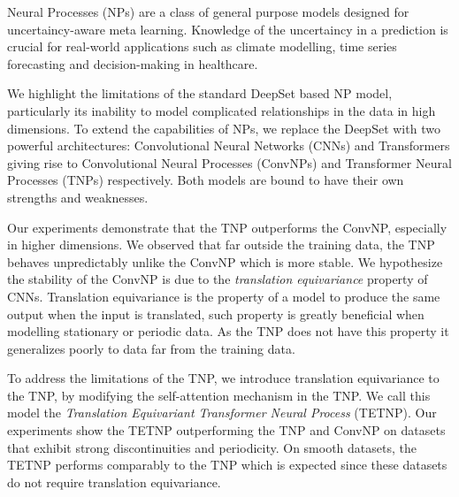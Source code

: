 \documentclass[../../main.tex]{subfiles}
\begin{document}

Neural Processes (NPs) are a class of general purpose models designed for uncertaincy-aware meta learning.  Knowledge of the uncertaincy in a prediction is crucial for real-world applications such as climate modelling, time series forecasting and decision-making in healthcare. 

We highlight the limitations of the standard DeepSet based NP model, particularly its inability to model complicated relationships in the data in high dimensions. To extend the capabilities of NPs, we replace the DeepSet with two powerful architectures: Convolutional Neural Networks (CNNs) and Transformers giving rise to Convolutional Neural Processes (ConvNPs) and Transformer Neural Processes (TNPs) respectively. Both models are bound to have their own strengths and weaknesses. 

Our experiments demonstrate that the TNP outperforms the ConvNP, especially in higher dimensions. We observed that far outside the training data, the TNP behaves unpredictably unlike the ConvNP which is more stable. We hypothesize the stability of the ConvNP is due to the \emph{translation equivariance} property of CNNs. Translation equivariance is the property of a model to produce the same output when the input is translated, such property is greatly beneficial when modelling stationary or periodic data.  As the TNP does not have this property it generalizes poorly to data far from the training data. 

To address the limitations of the TNP, we introduce translation equivariance to the TNP, by modifying the self-attention mechanism in the TNP. We call this model the \emph{Translation Equivariant Transformer Neural Process} (TETNP). Our experiments show the TETNP  outperforming the TNP and ConvNP on datasets that exhibit strong discontinuities and periodicity. On smooth datasets, the TETNP performs comparably to the TNP which is expected since these datasets do not require translation equivariance.
\end{document}
